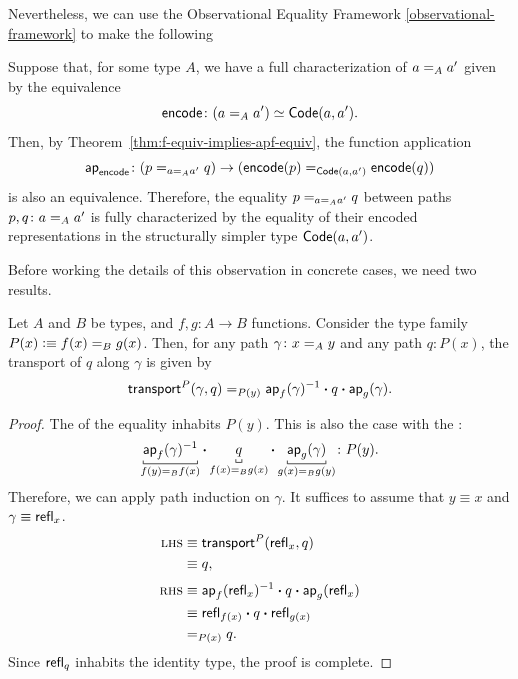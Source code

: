 Nevertheless, we can use the Observational Equality Framework \ref{observational-framework} to make the following

\begin{rem}\label{rem:characterization-of-2-paths}
    Suppose that, for some type $A$, we have a full characterization of $a \mathrel{=_{A}} a'$ given by the equivalence
    \[
        \fun{encode}\colon(a\eq A a')\simeq\fun{Code}(a,a').
    \]
    Then, by Theorem~\ref{thm:f-equiv-implies-apf-equiv}, the function application
    \[
        \fun{ap}_{\fun{encode}}\colon(p\eq{a\eq A a'}q)\to(\fun{encode}(p)\eq{\fun{Code}(a,a')}\fun{encode}(q))
    \]
    is also an equivalence. Therefore, the equality $p\mathrel{=_{a\mathrel{=_{A}}a'}}q$ between paths $p,q\colon a\eq Aa'$ is fully characterized by the equality of their encoded representations in the structurally simpler type $\mathsf{Code}(a,a')$.


Before working the details of this observation in concrete cases, we need two results.

\begin{lem} {}
    \label{lem:transport-in-identity-types}
    Let\/ $A$ and\/ $B$ be types, and\/ $f,g\colon A\to B$ functions. Consider the type family\/ $P(x)\mathrel{\vcentcolon}\equiv f(x)\mathrel{=_{B}} g(x)$. Then, for any path\/ $\gamma\colon x\eq A y$ and any path\/ $q\colon P(x)$, the transport of\/ $q$ along\/ $\gamma$ is given by
    \[
        \mathsf{transport}^P(\gamma,q)\mathrel{=_{P(y)}}
        \mathsf{ap}_f(\gamma)^{-1}\mathbin{\boldsymbol{\cdot}} q\mathbin{\boldsymbol{\cdot}}\mathsf{ap}_g(\gamma).
    \]
\end{lem}

\begin{proof}
    The \lhs of the equality inhabits $P(y)$. This is also the case with the \rhs:
    \[
        \explain[f(y)\eq Bf(x)]{\fun{ap}_f(\gamma)^{-1}}
        \ct\explain[f(x)\eq Bg(x)]{q\vphantom{{}_g(}}
        \ct\explain[g(x)\eq Bg(y)]{\fun{ap}_g(\gamma)}\colon P(y).
    \]    
    Therefore, we can apply path induction on $\gamma$. It suffices to assume that $y\equiv x$ and $\gamma\equiv\mathsf{refl}_x$.
    \begin{align*}
        \textsc{lhs}&\equiv\mathsf{transport}^P(\mathsf{refl}_x,q)\\
            &\equiv q,\\[1mm]
        \textsc{rhs}&\equiv\mathsf{ap}_f(\mathsf{refl}_x)^{-1}
            \mathbin{\boldsymbol{\cdot}} q\mathbin{\boldsymbol{\cdot}}\mathsf{ap}_g(\mathsf{refl}_x)\\
            &\equiv\mathsf{refl}_{f(x)}\mathbin{\boldsymbol{\cdot}} q\mathbin{\boldsymbol{\cdot}}\mathsf{refl}_{g(x)}\\
            &\mathrel{=_{P(x)}}q.
    \end{align*}
    Since $\mathsf{refl}_q$ inhabits the identity type, the proof is complete.
\end{proof}


\end{rem}
